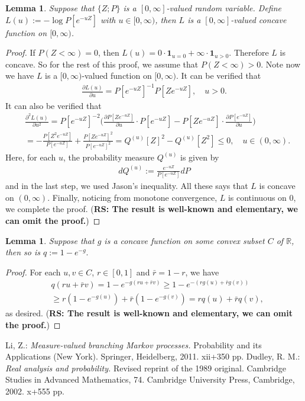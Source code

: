 \documentclass[12pt,a4paper]{amsart}
\numberwithin{equation}{section}
\theoremstyle{plain}
\newtheorem{lem}[thm]{Lemma}
\theoremstyle{definition}
\theoremstyle{remark}
\begin{document}
\begin{lem} \label{Lemma:CP!}
Suppose that $\{Z; P\}$ is a $[0,\infty]$-valued random variable.
Define $L(u):= - \log P[e^{- u Z}]$ with $u \in [0,\infty)$, then $L$ is a $[0,\infty]$-valued concave function on $[0,\infty)$.
\end{lem}
\begin{proof}
If $P(Z < \infty) = 0$, then $L(u) = 0\cdot \mathbf 1_{u=0} + \infty \cdot \mathbf 1_{u>0}$.
Therefore $L$ is concave.
So for the rest of this proof, we assume that $P(Z < \infty) > 0$.
Note now we have $L$ is a $[0,\infty)$-valued function on $[0,\infty)$.
It can be verified that
\begin{align}
 \frac{\partial L(u)}{\partial u}
 = P[e^{-u Z}]^{-1} P[Ze^{- u Z}]
, \quad u > 0.
 \end{align}
It can also be verified that
\begin{align}
 & \frac{\partial^2 L(u)}{\partial u^2}
 = P[e^{-uZ}]^{-2}\Big( \frac{\partial P[Ze^{-uZ}]}{\partial u} \cdot P[e^{-uZ}] - P[Ze^{-uZ}] \cdot \frac{\partial P[e^{-uZ}]}{\partial u}\Big)
 \\& = - \frac{P[Z^2 e^{-uZ}]}{P[e^{-uZ}]} + \frac{P[Ze^{-uZ}]^2}{P[e^{-uZ}]^2}
 = Q^{(u)}[Z]^2 - Q^{(u)}[Z^2]
 \leq 0,
 \quad u \in (0,\infty).
   \end{align}
Here, for each $u$, the probability measure $Q^{(u)}$ is given by
\begin{align}
 dQ^{(u)}
:= \frac{e^{-uZ}}{P[e^{-uZ}]} dP
 \end{align}
and in the last step, we used Jason's inequality.
All these says that $L$ is concave on $(0,\infty)$.
Finally, noticing from monotone convergence, $L$ is continuous on $0$, we complete the proof.
({\bf RS: The result is well-known and elementary, we can omit the proof.})
\end{proof}
\begin{lem} \label{Lemma:CE!}
Suppose that $g$ is a concave function on some convex subset $C$ of $\mathbb R$, then so is $q:= 1- e^{-g}.$
\end{lem}
\begin{proof}
For each $u,v \in C$, $r \in [0,1]$ and $\bar r = 1-r$, we have
\begin{align}
 &q(ru+\bar r v)
 = 1 - e^{- g(ru + \bar r v)}
 \geq 1 - e^{- ( r g(u) + \bar r g(v))}
 \\& \geq r(1- e^{- g(u)}) + \bar r (1 - e^{- g(v)})
 = rq(u) + \bar r q(v),
 \end{align}
as desired.
({\bf RS: The result is well-known and elementary, we can omit the proof.})
\end{proof}
\begin{thebibliography}{99}
Li, Z.:
\emph{Measure-valued branching Markov processes.}
Probability and its Applications (New York). Springer, Heidelberg, 2011. xii+350 pp.
Dudley, R. M.:
\emph{Real analysis and probability.}
Revised reprint of the 1989 original. Cambridge Studies in Advanced Mathematics, 74. Cambridge University Press, Cambridge, 2002. x+555 pp.
\end{thebibliography}
\end{document}

